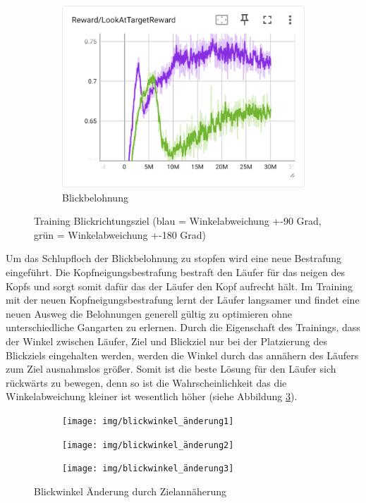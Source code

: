 \begin{figure}[H]
\begin{subfigure}{.49\textwidth}
      \centering  
      \includegraphics[width=\textwidth]{img/104_105_look_reward}
      \caption{Blickbelohnung}
      \label{fig:104_105_look_reward}
    \end{subfigure}
  \caption{Training Blickrichtungsziel (blau = Winkelabweichung +-90 Grad, grün = Winkelabweichung +-180 Grad)}
  \label{fig:training_blickrichtungsziel}
\end{figure}

Um das Schlupfloch der Blickbelohnung zu stopfen wird eine neue Bestrafung eingeführt. Die Kopfneigungsbestrafung bestraft den Läufer für das neigen des Kopfs und sorgt somit dafür das der Läufer den Kopf aufrecht hält. Im Training mit der neuen Kopfneigungsbestrafung lernt der Läufer langsamer und findet eine neuen Ausweg die Belohnungen generell gültig zu optimieren ohne unterschiedliche Gangarten zu erlernen. Durch die Eigenschaft des Trainings, dass der Winkel zwischen Läufer, Ziel und Blickziel nur bei der Platzierung des Blickziels eingehalten werden, werden die Winkel durch das annähern des Läufers zum Ziel ausnahmslos größer. Somit ist die beste Lösung für den Läufer sich rückwärts zu bewegen, denn so ist die Wahrscheinlichkeit das die Winkelabweichung kleiner ist wesentlich höher (siehe Abbildung \ref{fig:blickwinkel_änderung}).

\begin{figure}[H]
  \centering  
    \begin{subfigure}{.3\textwidth}
      \centering  
      \texttt{[image: img/blickwinkel\_änderung1]}
    \end{subfigure}
    \begin{subfigure}{.3\textwidth}
      \centering  
      \texttt{[image: img/blickwinkel\_änderung2]}
    \end{subfigure}
    \begin{subfigure}{.3\textwidth}
      \centering  
      \texttt{[image: img/blickwinkel\_änderung3]}
    \end{subfigure}
  \caption{Blickwinkel Änderung durch Zielannäherung}
  \label{fig:blickwinkel_änderung}
\end{figure}

